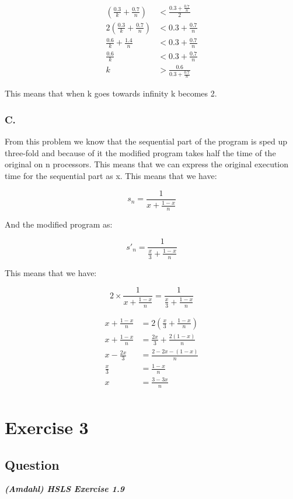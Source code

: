 \documentclass{article}
\begin{document}
\begin{align*}
    \left( \frac{0.3}{k} + \frac{0.7}{n} \right) &< \frac{0.3 + \frac{0.7}{n}}{2} \\
    2 \left( \frac{0.3}{k} + \frac{0.7}{n} \right) &< 0.3 + \frac{0.7}{n} \\
    \frac{0.6}{k} + \frac{1.4}{n} &< 0.3 + \frac{0.7}{n} \\
    \frac{0.6}{k} &< 0.3 + \frac{0.7}{n} \\
    k &> \frac{0.6}{0.3 + \frac{0.7}{n}}
\end{align*}

This means that when k goes towards infinity k becomes 2.


\subsubsection*{C.}
From this problem we know that the sequential part of the program is sped up three-fold and because of it the modified program takes half the time of the original on n processors. This means that we can express the original execution time for the sequential part as x. This means that we have:


\[
s_n = \frac{1}{x + \frac{1 - x}{n}}
\]

And the modified program as:

\[
s'_n = \frac{1}{\frac{x}{3} + \frac{1 - x}{n}}
\]

This means that we have:

\[
2 \times \frac{1}{x + \frac{1 - x}{n}} = \frac{1}{\frac{x}{3} + \frac{1 - x}{n}}
\]

\begin{align*}
    x + \frac{1 - x}{n} &= 2 \left( \frac{x}{3} + \frac{1 - x}{n} \right) \\
    x + \frac{1 - x}{n} &= \frac{2x}{3} + \frac{2(1 - x)}{n} \\
    x - \frac{2x}{3} &= \frac{2 - 2x - (1 - x)}{n} \\
    \frac{x}{3} &= \frac{1 - x}{n} \\
    x &= \frac{3 - 3x}{n} \\
\end{align*}


\section*{Exercise 3}
\subsection*{Question}
\textbf{\textit{(Amdahl) HSLS Exercise 1.9}}
\end{document}
